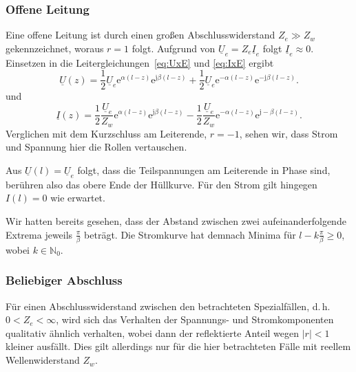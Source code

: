 \documentclass[paper=a4, parskip=half-, ngerman, fontsize=11pt]{scrreprt}
\begin{document}
\subsubsection{Offene Leitung}
Eine offene Leitung ist durch einen großen Abschlusswiderstand $Z_{e} \gg Z_{w}$ gekennzeichnet, woraus $r=1$ folgt.
Aufgrund von $\underline{U}_{e} = Z_{e} \underline{I}_{e}$ folgt $\underline{I}_{e} \approx 0$. Einsetzen in die
Leitergleichungen~\eqref{eq:UxE} und \eqref{eq:IxE} ergibt
\begin{equation*}
\underline{U}(z) =
\frac{1}{2} \underline{U}_{e} \mathrm{e}^{\alpha (l - z)} \mathrm{e}^{\mathrm{j} \beta (l - z)}
+
\frac{1}{2} \underline{U}_{e} \mathrm{e}^{- \alpha (l - z)} \mathrm{e}^{- \mathrm{j} \beta (l - z)}.
\end{equation*}
und
\begin{equation*}
\underline{I}(z) =
\frac{1}{2} \frac{\underline{U}_{e}}{Z_{w}} \mathrm{e}^{\alpha (l - z)} \mathrm{e}^{\mathrm{j} \beta (l - z)}
-
\frac{1}{2} \frac{\underline{U}_{e}}{Z_{w}} \mathrm{e}^{- \alpha (l - z)} \mathrm{e}^{\mathrm{j} -\beta (l - z)}.
\end{equation*}
Verglichen mit dem Kurzschluss am Leiterende, $r=-1$, sehen wir, dass Strom und Spannung hier die Rollen vertauschen.

Aus $\underline{U}(l) = \underline{U}_{e}$ folgt, dass die Teilspannungen am Leiterende in Phase sind, berühren also
das obere Ende der Hüllkurve. Für den Strom gilt hingegen $I(l) = 0$ wie erwartet.

Wir hatten bereits gesehen, dass der Abstand zwischen zwei aufeinanderfolgende Extrema jeweils $\frac{\pi}{\beta}$
beträgt. Die Stromkurve hat demnach Minima für $l - k \frac{\pi}{\beta} \ge 0$, wobei $k \in \mathbb{N}_{0}$.



\subsubsection{Beliebiger Abschluss}
Für einen Abschlusswiderstand zwischen den betrachteten Spezialfällen, d.\,h. $0 < Z_{e} < \infty$, wird sich das
Verhalten der Spannungs- und Stromkomponenten qualitativ ähnlich verhalten, wobei dann der reflektierte Anteil wegen
$\left| r \right| < 1$ kleiner ausfällt. Dies gilt allerdings nur für die hier betrachteten Fälle mit reellem
Wellenwiderstand $Z_{w}$.
\end{document}
